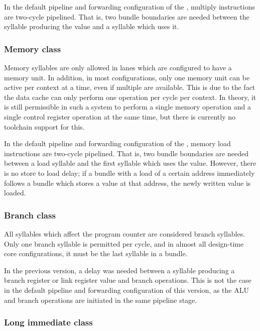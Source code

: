In the default pipeline and forwarding configuration of the \rvex{}, multiply 
instructions are two-cycle pipelined. That is, two bundle boundaries are needed 
between the syllable producing the value and a syllable which uses it.


\subsubsection{Memory class}
\label{sec:core-ug-isa-syl-classes-mem}

Memory syllables are only allowed in lanes which are configured to have a memory 
unit. In addition, in most configurations, only one memory unit can be active 
per context at a time, even if multiple are available. This is due to the fact 
the data cache can only perform one operation per cycle per context. In theory, 
it is still permissible in such a system to perform a single memory operation 
and a single control register operation at the same time, but there is currently
no toolchain support for this.

In the default pipeline and forwarding configuration of the \rvex{}, memory load
instructions are two-cycle pipelined. That is, two bundle boundaries are needed 
between a load syllable and the first syllable which uses the value. However,
there is no store to load delay; if a bundle with a load of a certain address
immediately follows a bundle which stores a value at that address, the newly
written value is loaded.


\subsubsection{Branch class}
\label{sec:core-ug-isa-syl-classes-br}

All syllables which affect the program counter are considered branch syllables. 
Only one branch syllable is permitted per cycle, and in almost all design-time 
core configurations, it must be the last syllable in a bundle.

In the previous \rvex{} version, a delay was needed between a syllable producing
a branch register or link register value and branch operations. This is not the
case in the default pipeline and forwarding configuration of this \rvex{}
version, as the ALU and branch operations are initiated in the same pipeline
stage.


\subsubsection{Long immediate class}
\label{sec:core-ug-isa-syl-classes-limm}

